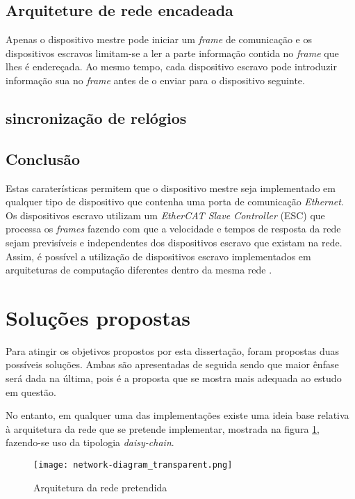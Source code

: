 \subsection{Arquiteture de rede encadeada}
Apenas o dispositivo mestre pode iniciar um \emph{frame} de comunicação
e os dispositivos escravos limitam-se a ler a parte informação contida
no \emph{frame} que lhes é endereçada. Ao mesmo tempo, cada dispositivo
escravo pode introduzir informação sua  no \emph{frame} antes de o enviar
para o dispositivo seguinte.

\subsection{sincronização de relógios}


\subsection{Conclusão}
Estas caraterísticas permitem que o dispositivo mestre seja implementado
em qualquer tipo de dispositivo que contenha uma porta de comunicação 
\emph{Ethernet}. Os dispositivos escravo utilizam um \emph{EtherCAT Slave
Controller} (ESC) que processa os \emph{frames} fazendo com que a velocidade
e tempos de resposta da rede sejam previsíveis e independentes dos 
dispositivos escravo que existam na rede. Assim, é possível a utilização
de dispositivos escravo implementados em arquiteturas de computação
diferentes dentro da mesma rede \ecat.


\section{Soluções propostas} \label{sec:solution}

Para atingir os objetivos propostos por esta dissertação, foram propostas 
duas possíveis soluções. Ambas são apresentadas de seguida sendo que
maior ênfase será dada na última, pois é a proposta que se mostra mais
adequada ao estudo em questão.

No entanto, em qualquer uma das implementações existe uma ideia base
relativa à arquitetura da rede \ecat que se pretende implementar,
mostrada na figura \ref{fig:network-architecture}, fazendo-se uso da
tipologia \emph{daisy-chain}.

\begin{figure}
 \centering
 \texttt{[image: network-diagram\_transparent.png]}
 \caption{Arquitetura da rede \ecat pretendida}
 \label{fig:network-architecture}
\end{figure}



